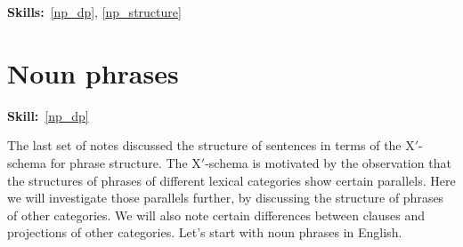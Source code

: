 \documentclass{article}
\begin{document}
\maketitle
\subtitle{Topic 7 Course Notes: Nonverbal XPs\\
Arguments of N \& the DP Hypothesis}
\hfill{}\textbf{Skills:}~\ref{np_dp},
\ref{np_structure}
\section{Noun phrases}
\hfill{}\textbf{Skill:}~\ref{np_dp}

The last set of notes discussed the structure of sentences in terms of the X$'$-schema for phrase structure.
The X$'$-schema is motivated by the observation that the structures of phrases of different lexical categories show certain parallels.
Here we will investigate  those parallels further, by discussing the structure of phrases of other categories.
We will also note certain differences between clauses and projections of other categories.
Let's start with noun phrases in English.
\end{document}
